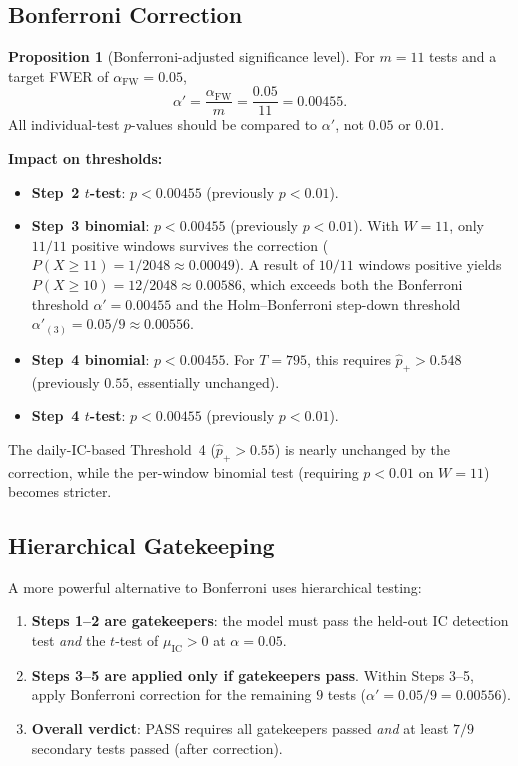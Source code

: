 \documentclass[11pt,a4paper]{article}
\theoremstyle{definition}
\newtheorem{proposition}{Proposition}[section]
\newcommand{\IC}{\operatorname{IC}}
\begin{document}
\subsection{Bonferroni Correction}

\begin{proposition}[Bonferroni-adjusted significance level]
For $m=11$ tests and a target FWER of $\alpha_{\text{FW}}=0.05$,
\begin{equation}
    \boxed{\alpha' = \frac{\alpha_{\text{FW}}}{m}
                   = \frac{0.05}{11}
                   = 0.00455}.
    \label{eq:bonferroni}
\end{equation}
All individual-test $p$-values should be compared to $\alpha'$, not
$0.05$ or $0.01$.
\end{proposition}

\textbf{Impact on thresholds:}
\begin{itemize}[nosep]
    \item \textbf{Step~2 $t$-test}: $p < 0.00455$ (previously $p < 0.01$).
    \item \textbf{Step~3 binomial}: $p < 0.00455$ (previously $p < 0.01$).
          With $W=11$, only $11/11$ positive windows survives the correction
          ($P(X \geq 11) = 1/2048 \approx 0.00049$).  A result of $10/11$
          windows positive yields $P(X \geq 10) = 12/2048 \approx 0.00586$,
          which exceeds both the Bonferroni threshold $\alpha' = 0.00455$
          and the Holm--Bonferroni step-down threshold
          $\alpha'_{(3)} = 0.05/9 \approx 0.00556$.
    \item \textbf{Step~4 binomial}: $p < 0.00455$. For $T=795$, this
          requires $\hat{p}_{+} > 0.548$ (previously $0.55$, essentially
          unchanged).
    \item \textbf{Step~4 $t$-test}: $p < 0.00455$ (previously $p < 0.01$).
\end{itemize}

The daily-IC-based Threshold~4 ($\hat{p}_{+} > 0.55$) is nearly unchanged
by the correction, while the per-window binomial test (requiring $p<0.01$
on $W=11$) becomes stricter.

\subsection{Hierarchical Gatekeeping}

A more powerful alternative to Bonferroni uses hierarchical testing:
\begin{enumerate}[nosep]
    \item \textbf{Steps 1--2 are gatekeepers}: the model must pass the
          held-out IC detection test \emph{and} the $t$-test of
          $\mu_{\IC} > 0$ at $\alpha=0.05$.
    \item \textbf{Steps 3--5 are applied only if gatekeepers pass}.
          Within Steps 3--5, apply Bonferroni correction for the
          remaining $9$ tests ($\alpha' = 0.05/9 = 0.00556$).
    \item \textbf{Overall verdict}: PASS requires all gatekeepers
          passed \emph{and} at least $7/9$ secondary tests passed
          (after correction).
\end{enumerate}
\end{document}
